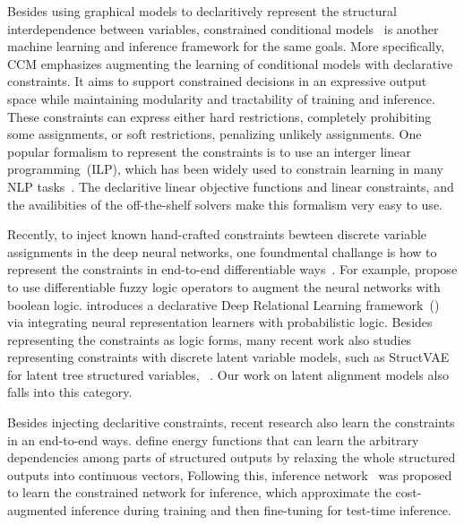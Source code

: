 Besides using graphical
models to declaritively represent the structural interdependence
between variables, constrained conditional
models~\citep[CCM,][]{chang2012structured} is another machine learning
and inference framework for the same goals. More specifically, CCM
emphasizes augmenting the learning of conditional models with
declarative constraints. It aims to support constrained decisions in
an expressive output space while maintaining modularity and
tractability of training and inference. These constraints can express
either hard restrictions, completely prohibiting some assignments, or
soft restrictions, penalizing unlikely assignments. One popular
formalism to represent the constraints is to use an interger linear
programming~(ILP), which has been widely used to constrain learning in
many NLP tasks~\citep{roth2007global}. The declaritive linear
objective functions and linear constraints, and the availibities of
the off-the-shelf solvers make this formalism very easy to use.

 Recently, to inject
known hand-crafted constraints bewteen discrete variable assignments
in the deep neural networks, one foundmental challange is how to
represent the constraints in end-to-end differentiable
ways~\cite{bach2017hinge}. For example, \citet{li2019augmenting}
propose to use differentiable fuzzy logic operators to augment the
neural networks with boolean logic. \citet{pacheco2021modeling}
introduces a declarative Deep Relational Learning framework~(\DRAIL)
via integrating neural representation learners with probabilistic
logic. Besides representing the constraints as logic forms, many
recent work also studies representing constraints with discrete latent
variable models, such as StructVAE for latent tree structured
variables, ~\cite{yin2018structvae, corro2019learning}. Our work on
latent alignment models also falls into this category.

 Besides injecting
declaritive constraints, recent research also learn the constraints in
an end-to-end ways. \citet[SPEN,][]{belanger2016structured} define
energy functions that can learn the arbitrary dependencies among parts
of structured outputs by relaxing the whole structured outputs into
continuous vectors, Following this, inference
network~\cite{tu2018learning} was proposed to learn the constrained
network for inference, which approximate the cost-augmented inference
during training and then fine-tuning for test-time inference.

